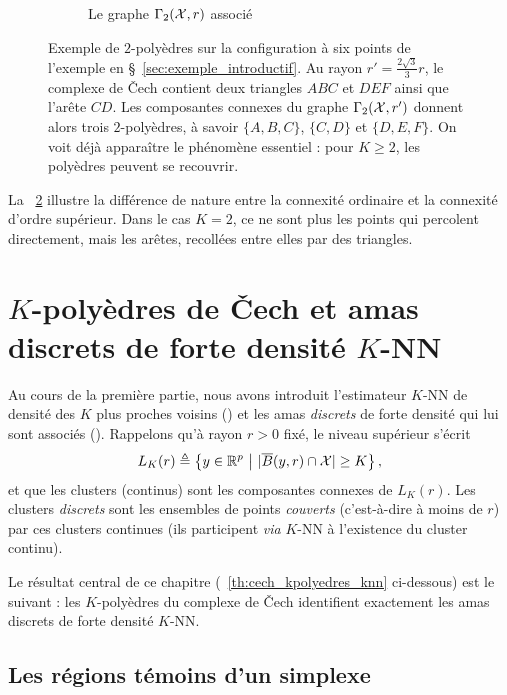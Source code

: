 \begin{figure}[!ht]
\begin{subfigure}[b]{0.48\textwidth}
        \caption{Le graphe $\Gamma_2(\mathcal{X},r)$ associé}
        \label{fig:chap2_gamma2_exemple}
    \end{subfigure}
    \caption{Exemple de $2$-polyèdres sur la configuration à six points de l'exemple en \S~\ref{sec:exemple_introductif}. Au rayon $r'=\frac{2\sqrt 3}{3}r$, le complexe de \v Cech contient deux triangles $ABC$ et $DEF$ ainsi que l'arête $CD$. Les composantes connexes du graphe $\Gamma_2(\mathcal{X},r')$ donnent alors trois $2$-polyèdres, à savoir $\{A,B,C\}$, $\{C,D\}$ et $\{D,E,F\}$. On voit déjà apparaître le phénomène essentiel : pour $K\ge 2$, les polyèdres peuvent se recouvrir.}
    \label{fig:chap2_exemple_kpolyedres}
\end{figure}

La \Fig~\ref{fig:chap2_exemple_kpolyedres} illustre la différence de nature entre la connexité ordinaire et la connexité d'ordre supérieur. Dans le cas $K=2$, ce ne sont plus les points qui percolent directement, mais les arêtes, recollées entre elles par des triangles.

\section{$K$-polyèdres de \v Cech et amas discrets de forte densité $K$-NN}
\label{sec:correspondance_KPolydres_KNN}


Au cours de la première partie, nous avons introduit l'estimateur $K$-NN de densité des $K$ plus proches voisins (\Def[def:K-NN]) et les amas \emph{discrets} de forte densité qui lui sont associés (). Rappelons qu'à rayon $r>0$ fixé, le niveau supérieur s'écrit
\[
    L_K(r) \triangleq \left\{ y\in\mathbb R^p \ \middle|\ \lvert \overline B(y,r)\cap \mathcal{X} \rvert\ge K \right\},
\]
et que les clusters ({continus}) sont les composantes connexes de $L_K(r)$. Les clusters \emph{discrets} sont les ensembles de points \emph{couverts} (c'est-à-dire à moins de $r$) par ces clusters continues (ils participent \emph{via} $K$-NN à l'existence du cluster continu).

Le résultat central de ce chapitre (\Th~\ref{th:cech_kpolyedres_knn} ci-dessous) est le suivant : les $K$-polyèdres du complexe de \v Cech identifient exactement les amas discrets de forte densité $K$-NN.

\subsection{Les régions témoins d'un simplexe}


